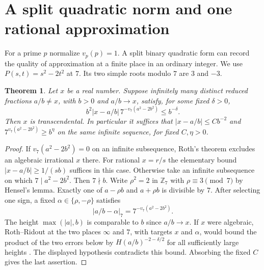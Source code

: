 \documentclass[11pt,a4paper]{article}
\newtheorem{theorem}{Theorem}[section]
\begin{document}
\section{A split quadratic norm and one rational approximation}\label{sec:pell}
For a prime $p$ normalize $v_p(p)=1$. A split binary quadratic form can
record the quality of approximation at a finite place in an ordinary
integer. We use $P(s,t)=s^2-2t^2$ at $7$. Its two simple roots modulo
$7$ are $3$ and $-3$.

\begin{theorem}\label{th:pelldrop}
Let $x$ be a real number. Suppose infinitely many distinct reduced fractions
$a/b\ne x$, with $b>0$ and $a/b\to x$, satisfy, for some fixed
$\delta>0$,
\[
 b^2|x-a/b|\,7^{-v_7(a^2-2b^2)}\le b^{-\delta}.
\]
Then $x$ is transcendental. In particular it suffices that
$|x-a/b|\le C b^{-2}$ and $7^{v_7(a^2-2b^2)}\ge b^\eta$
on the same infinite sequence, for fixed $C,\eta>0$.
\end{theorem}
\begin{proof}
If $v_7(a^2-2b^2)=0$ on an infinite subsequence, Roth's theorem
\cite{pellroth} excludes an algebraic irrational $x$ there. For rational
$x=r/s$ the elementary bound $|x-a/b|\ge1/(sb)$ suffices in this case.
Otherwise take an infinite subsequence on which $7\mid a^2-2b^2$.
Then $7\nmid b$. Write $\rho^2=2$ in $\mathbb Z_7$ with
$\rho\equiv3\pmod 7$ by Hensel's lemma.
Exactly one of $a-\rho b$ and $a+\rho b$ is divisible by $7$.
After selecting one sign, a fixed $\alpha\in\{\rho,-\rho\}$ satisfies
\[
 |a/b-\alpha|_7=7^{-v_7(a^2-2b^2)}.
\]
The height $\max(|a|,b)$ is comparable to $b$ since $a/b\to x$.
If $x$ were algebraic, Roth--Ridout at the two places $\infty$ and $7$,
with targets $x$ and $\alpha$, would bound the product of the two errors
below by $H(a/b)^{-2-\delta/2}$ for all sufficiently large heights
\cite[Thm.~1]{cor}. The displayed hypothesis contradicts this bound.
Absorbing the fixed $C$ gives the last assertion.
\end{proof}
\end{document}
